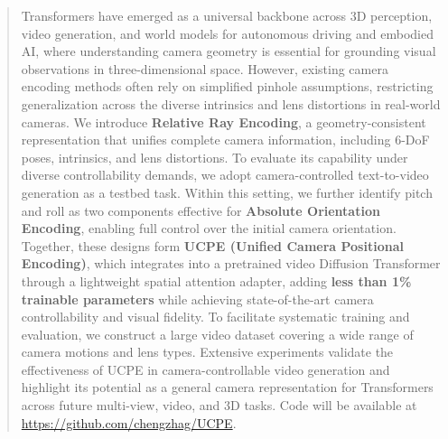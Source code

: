 \begin{abstract}
    Transformers have emerged as a universal backbone across 3D perception, video generation, and world models for autonomous driving and embodied AI, where understanding camera geometry is essential for grounding visual observations in three-dimensional space.
    However, existing camera encoding methods often rely on simplified pinhole assumptions, restricting generalization across the diverse intrinsics and lens distortions in real-world cameras.
    We introduce \textbf{Relative Ray Encoding}, a geometry-consistent representation that unifies complete camera information, including 6-DoF poses, intrinsics, and lens distortions.
    To evaluate its capability under diverse controllability demands, we adopt camera-controlled text-to-video generation as a testbed task.
    Within this setting, we further identify pitch and roll as two components effective for \textbf{Absolute Orientation Encoding}, enabling full control over the initial camera orientation.
    Together, these designs form \textbf{UCPE (Unified Camera Positional Encoding)}, which integrates into a pretrained video Diffusion Transformer through a lightweight spatial attention adapter, adding \textbf{less than 1\% trainable parameters} while achieving state-of-the-art camera controllability and visual fidelity.
    To facilitate systematic training and evaluation, we construct a large video dataset covering a wide range of camera motions and lens types.
    Extensive experiments validate the effectiveness of UCPE in camera-controllable video generation and highlight its potential as a general camera representation for Transformers across future multi-view, video, and 3D tasks.
    Code will be available at \url{https://github.com/chengzhag/UCPE}.
\end{abstract}
\vspace{-1em}
